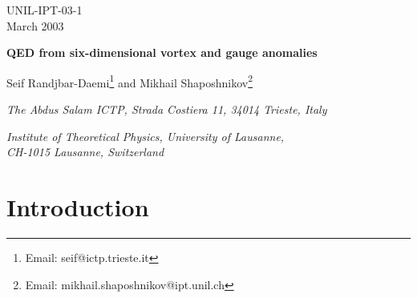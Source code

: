 \documentclass[a4paper,12pt]{article}
\begin{document}
\pagestyle{empty}
\begin{flushright}
UNIL-IPT-03-1\\ 
March 2003
\end{flushright}
\vspace*{5mm}

\begin{center}

{\Large\bf QED from six-dimensional vortex and gauge anomalies}

\vspace{1cm}

{\large Seif Randjbar-Daemi\coordHE{}\footnote{Email: seif@ictp.trieste.it}
and Mikhail Shaposhnikov\coordHE{}\footnote{Email:
mikhail.shaposhnikov@ipt.unil.ch}}\\

\vspace{.6cm}

{\it{\coordHE{} The Abdus Salam ICTP, Strada Costiera 11, 34014 Trieste,
Italy}}

{\it {\coordHE{} Institute of Theoretical Physics, University of Lausanne,\\ 
CH-1015 Lausanne, Switzerland}}
\vspace{.4cm}
\end{center}

\vspace{1cm}  

\begin{abstract}

Starting from an anomaly-free Abelian Higgs model coupled to gravity
in a 6-dimensional space-time we construct an effective
four-dimensional theory of charged fermions interacting with U(1)
Abelian gauge field and gravity, both localised near the core of a
Nielsen-Olesen vortex configuration. We show that an anomaly free
theory in 6-dimensions can give rise to an anomalous  theory in D=4,
which suggests a possibility of consistent regularisation of abelian
anomalous chiral gauge theories in four dimensions. We also show that
the spectrum of charged bulk fermions has a mass gap. 

\end{abstract}

\vfill

\eject
\pagestyle{empty}
\setcounter{page}{1}
\setcounter{footnote}{0}
\pagestyle{plain}

\section{Introduction}
\end{document}
